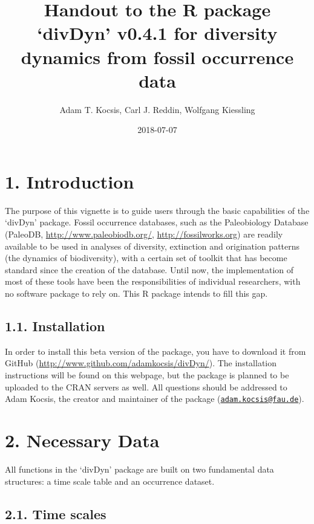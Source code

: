 \documentclass[]{article}
\title{Handout to the R package `divDyn' v0.4.1 for diversity dynamics from
fossil occurrence data}
\author{Adam T. Kocsis, Carl J. Reddin, Wolfgang Kiessling}
\date{2018-07-07}
\begin{document}
\maketitle

\hypertarget{introduction}{%
\section{1. Introduction}\label{introduction}}

The purpose of this vignette is to guide users through the basic
capabilities of the `divDyn' package. Fossil occurrence databases, such
as the Paleobiology Database (PaleoDB, \url{http://www.paleobiodb.org/},
\url{http://fossilworks.org}) are readily available to be used in
analyses of diversity, extinction and origination patterns (the dynamics
of biodiversity), with a certain set of toolkit that has become standard
since the creation of the database. Until now, the implementation of
most of these tools have been the responsibilities of individual
researchers, with no software package to rely on. This R package intends
to fill this gap.

\hypertarget{installation}{%
\subsection{1.1. Installation}\label{installation}}

In order to install this beta version of the package, you have to
download it from GitHub
(\url{http://www.github.com/adamkocsis/divDyn/}). The installation
instructions will be found on this webpage, but the package is planned
to be uploaded to the CRAN servers as well. All questions should be
addressed to Adam Kocsis, the creator and maintainer of the package
(\href{mailto:adam.kocsis@fau.de}{\nolinkurl{adam.kocsis@fau.de}}).

\hypertarget{necessary-data}{%
\section{2. Necessary Data}\label{necessary-data}}

All functions in the `divDyn' package are built on two fundamental data
structures: a time scale table and an occurrence dataset.

\hypertarget{time-scales}{%
\subsection{2.1. Time scales}\label{time-scales}}
\end{document}
